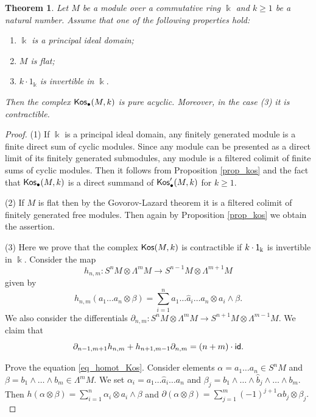 \documentclass{amsart}
\numberwithin{equation}{section}
\newtheorem{theorem}{Theorem}[section]
\theoremstyle{definition}
\def\kk{\Bbbk}
\begin{document}
\begin{theorem}\label{th_kos} 
Let $M$ be a module over a commutative ring $\kk$ and $k\geq 1$ be a natural number. Assume that one of the following properties hold: 
\begin{enumerate}
    \item $\kk$ is a principal ideal domain;
    \item $M$ is flat;
    \item  $k \cdot 1_\kk$ is invertible in $\kk.$
\end{enumerate}
Then the complex ${\sf Kos}_\bullet(M,k)$ is pure acyclic. Moreover, in the case (3) it is contractible. 
\end{theorem}
\begin{proof}
(1) If $\kk$ is a principal ideal domain, any finitely generated module is a finite direct sum of cyclic modules. Since any module can be presented as a direct limit of its finitely generated submodules, any module is a filtered colimit of finite sums of cyclic modules. Then it follows from Proposition \ref{prop_kos} and the fact that ${\sf Kos}_\bullet(M,k)$ is a direct summand of ${\sf Kos}'_\bullet(M,k)$ for $k\geq 1.$

(2) If $M$ is flat then by the Govorov-Lazard theorem it is a filtered colimit of finitely generated free modules. Then again by Proposition \ref{prop_kos} we obtain the assertion. 

(3) Here we prove that the complex ${\sf Kos}(M,k)$ is contractible if $k\cdot {\sf 1}_\kk$ is invertible in $\kk$. Consider the map 
$$h_{n,m}:S^nM \otimes \Lambda^m M \longrightarrow S^{n-1}M\otimes \Lambda^{m+1}M $$
given by
$$h_{n,m}(a_1\dots a_n \otimes \beta) = \sum_{i=1}^n a_1\dots \hat a_i \dots a_n \otimes a_i \wedge \beta.$$ We also consider the differentials
$\partial_{n,m}:S^nM \otimes \Lambda^mM\to S^{n+1}M \otimes \Lambda^{m-1}M.$
We claim that 
\begin{equation}\label{eq_homot_Kos}
\partial_{n-1,m+1} h_{n,m} + h_{n+1,m-1} \partial_{n,m} = (n+m) \cdot {\sf id}.
\end{equation}

Prove the equation \eqref{eq_homot_Kos}.  Consider elements  $\alpha=a_1 \dots  a_n\in S^n M$ and $\beta=b_1 \wedge \dots \wedge b_m\in \Lambda^m M.$ We set $\alpha_i=a_1 \dots \hat a_i \dots a_n$ and $\beta_j=b_1 \wedge \dots \wedge \hat b_j \wedge \dots \wedge b_m.$ Then $ h(\alpha\otimes \beta )=\sum_{i=1}^n \alpha_i \otimes a_i \wedge \beta$ and $ \partial(\alpha \otimes \beta )=\sum_{j=1}^m (-1)^{j+1} \alpha b_j\otimes \beta_j.$ 


\end{proof}
\end{document}
